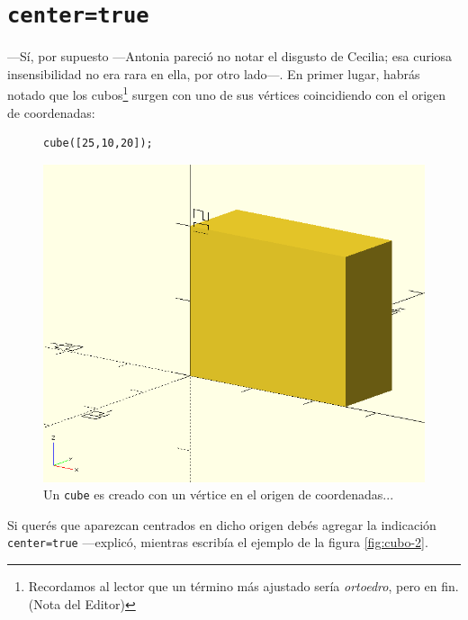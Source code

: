  \section{\texttt{center=true}}


 ---Sí, por supuesto ---Antonia pareció no notar el disgusto de
 Cecilia; esa curiosa insensibilidad no era rara en ella, por otro
 la\-do---. En primer lugar, habrás notado que los
 cubos\footnote{Recordamos al lector que un término más ajustado sería
   \emph{ortoedro}, pero en fin. (Nota del Editor)} surgen con uno de
 sus vértices coincidiendo con el origen de coordenadas:

\begin{figure}[ht]
  \begin{minipage}[]{.5\textwidth}
    \begin{lstlisting}[numbers=none]
cube([25,10,20]);
    \end{lstlisting}
  \end{minipage}\hfill
   \begin{minipage}[]{.5\textwidth}
     \centering
     \includegraphics[width=\textwidth]{imagenes/cubo-1}
   \end{minipage}
   \caption{Un \lstinline!cube! es creado con un vértice en el origen
     de coordenadas...}
  \label{fig:cubo-1}
\end{figure}


\guillemotright Si querés que aparezcan centrados en dicho origen
debés agregar la indicación \lstinline!center=true! ---explicó,
mientras escribía el ejemplo de la figura \ref{fig:cubo-2}.

